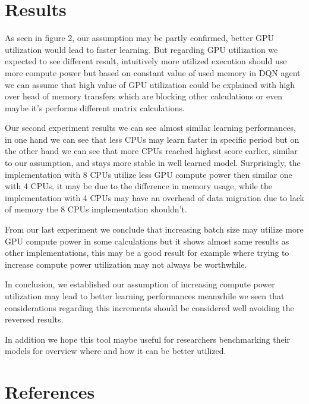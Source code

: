 \documentclass[11 pt, twocolumn]{article}
\begin{document}
\section{Results}
As seen in figure 2, our assumption may be partly confirmed, better GPU utilization would lead to faster learning. But regarding GPU utilization we expected to see different result, intuitively more utilized execution should use more compute power but based on constant value of used memory in DQN agent we can assume that high value of GPU utilization could be explained with high over head of memory transfers which are blocking other calculations or even maybe it's performs different matrix calculations.


Our second experiment results we can see almost similar learning performances, in one hand we can see that less CPUs may learn faster in specific period but on the other hand we can see that more CPUs reached highest score earlier, similar to our assumption, and stays more stable in well learned model. Surprisingly, the implementation with 8 CPUs utilize less GPU compute power then similar one with 4 CPUs, it may be due to the difference in memory usage, while the implementation with 4 CPUs may have an overhead of data migration due to lack of memory the 8 CPUs implementation shouldn't.


From our last experiment we conclude that increasing batch size may utilize more GPU compute power in some calculations but it shows almost same results as other implementations, this may be a good result for example where trying to increase compute power utilization may not always be worthwhile.


In conclusion, we established our assumption of increasing compute power utilization may lead to better learning performances meanwhile we seen that considerations regarding this increments should be considered well avoiding the reversed results.


In addition we hope this tool maybe useful for researchers benchmarking their models for overview where and how it can be better utilized.


\section{References}
\end{document}
